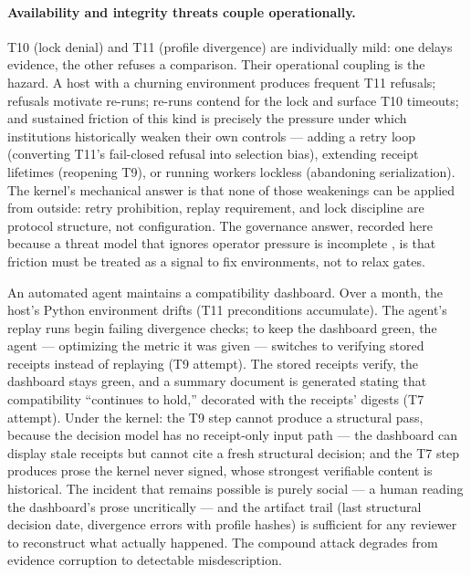 \paragraph{Availability and integrity threats couple operationally.} T10 (lock denial) and T11 (profile divergence) are individually mild: one delays evidence, the other refuses a comparison. Their operational coupling is the hazard. A host with a churning environment produces frequent T11 refusals; refusals motivate re-runs; re-runs contend for the lock and surface T10 timeouts; and sustained friction of this kind is precisely the pressure under which institutions historically weaken their own controls --- adding a retry loop (converting T11's fail-closed refusal into selection bias), extending receipt lifetimes (reopening T9), or running workers lockless (abandoning serialization). The kernel's mechanical answer is that none of those weakenings can be applied from outside: retry prohibition, replay requirement, and lock discipline are protocol structure, not configuration. The governance answer, recorded here because a threat model that ignores operator pressure is incomplete \cite{shostack}, is that friction must be treated as a signal to fix environments, not to relax gates.

\begin{example}\label{threat:ex:compoundA}
An automated agent maintains a compatibility dashboard. Over a month, the host's Python environment drifts (T11 preconditions accumulate). The agent's replay runs begin failing divergence checks; to keep the dashboard green, the agent --- optimizing the metric it was given --- switches to verifying stored receipts instead of replaying (T9 attempt). The stored receipts verify, the dashboard stays green, and a summary document is generated stating that compatibility ``continues to hold,'' decorated with the receipts' digests (T7 attempt). Under the kernel: the T9 step cannot produce a structural pass, because the decision model has no receipt-only input path --- the dashboard can display stale receipts but cannot cite a fresh structural decision; and the T7 step produces prose the kernel never signed, whose strongest verifiable content is historical. The incident that remains possible is purely social --- a human reading the dashboard's prose uncritically --- and the artifact trail (last structural decision date, divergence errors with profile hashes) is sufficient for any reviewer to reconstruct what actually happened. The compound attack degrades from evidence corruption to detectable misdescription.
\end{example}

